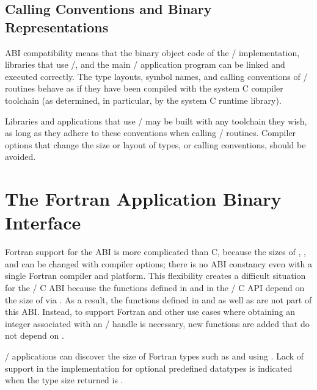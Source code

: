 \subsection{Calling Conventions and Binary Representations}

ABI compatibility 
means that the binary object code of the \MPI/ implementation, 
libraries that use \MPI/, and the main \MPI/ application 
program can be linked and executed correctly.
The type layouts, symbol names, and calling conventions of 
\MPI/ routines behave as if they have been compiled with the 
system C compiler toolchain 
(as determined, in particular, by the system C runtime library).

\begin{users}
Libraries and applications that use \MPI/ may be built with any toolchain they wish, 
as long as they adhere to these conventions when calling \MPI/ routines. 
Compiler options that change the size or layout of types, or calling conventions, 
should be avoided.
\end{users}

\section{The Fortran Application Binary Interface}
\label{sec:fortran-abi}

Fortran support for the ABI is more complicated than C,
because the sizes of , ,
and  can be changed with compiler options;
there is no ABI constancy even with a single Fortran compiler and platform.
This flexibility creates a difficult situation for the \MPI/ C ABI
because the functions defined in 
and  in the \MPI/ C API
depend on the size of  via .
As a result, the functions defined in 
and  
as well as  are not part of this ABI.
Instead, to support Fortran and other use cases where obtaining an
integer associated with an \MPI/ handle is necessary, new functions are
added that do not depend on .

\MPI/ applications can discover the size of Fortran types such as
 and  using .
Lack of support in the implementation for optional predefined datatypes
is indicated when the type size returned is
. %

